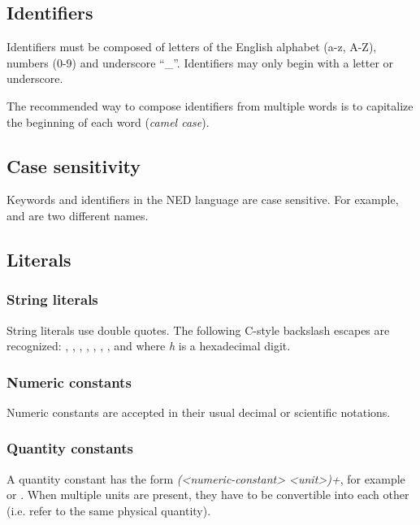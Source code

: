 \subsection{Identifiers}

Identifiers must be composed of letters of the English alphabet (a-z, A-Z),
numbers (0-9) and underscore ``\_''. Identifiers may only begin with a
letter or underscore.

The recommended way to compose identifiers from multiple words is to
capitalize the beginning of each word (\textit{camel case}).


\subsection{Case sensitivity}

Keywords and identifiers in the NED language are case sensitive. For example,
 and  are two different names.


\subsection{Literals}

\subsubsection{String literals}

String literals use double quotes. The following C-style backslash
escapes are recognized: , , , ,
, \ttt{{\textbackslash}{\textbackslash}}, , and  where \textit{h} is a
hexadecimal digit.

\subsubsection{Numeric constants}

Numeric constants are accepted in their usual decimal or
scientific notations.

\subsubsection{Quantity constants}

A quantity constant has the form \textit{(<numeric-constant> <unit>)+}, for
example  or . When multiple units are present,
they have to be convertible into each other (i.e. refer to the same physical
quantity).

